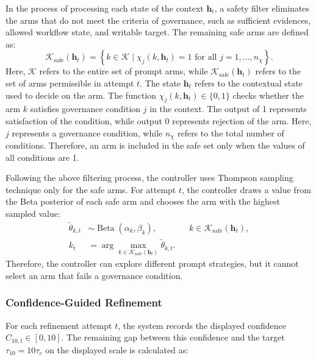 \documentclass[pdflatex,sn-basic]{sn-jnl}
\begin{document}
In the process of processing each state of the context $\mathbf{h}_t$, a safety filter eliminates the arms that do not meet the criteria of governance, such as sufficient evidences, allowed workflow state, and writable target. The remaining safe arms are defined as:
\begin{equation}
\mathcal{K}_{\mathrm{safe}}(\mathbf{h}_t)
=
\left\{k\in\mathcal{K}\mid
\chi_j(k,\mathbf{h}_t)=1
\text{ for all }j=1,\ldots,n_{\chi}\right\}.
\end{equation}
Here, $\mathcal{K}$ refers to the entire set of prompt arms, while $\mathcal{K}_{\mathrm{safe}}(\mathbf{h}_t)$ refers to the set of arms permissible in attempt $t$. The state $\mathbf{h}_t$ refers to the contextual state used to decide on the arm. The function $\chi_j(k,\mathbf{h}_t)\in\{0,1\}$ checks whether the arm $k$ satisfies governance condition $j$ in the context. The output of 1 represents satisfaction of the condition, while output 0 represents rejection of the arm. Here, $j$ represents a governance condition, while $n_{\chi}$ refers to the total number of conditions. Therefore, an arm is included in the safe set only when the values of all conditions are 1.

Following the above filtering process, the controller uses Thompson sampling technique only for the safe arms. For attempt $t$, the controller draws a value from the Beta posterior of each safe arm and chooses the arm with the highest sampled value:
\begin{equation}
\begin{aligned}
\widetilde{\theta}_{k,t}
&\sim \operatorname{Beta}(\alpha_k,\beta_k),
&& k\in\mathcal{K}_{\mathrm{safe}}(\mathbf{h}_t),\\
k_t
&=\arg\max_{k\in\mathcal{K}_{\mathrm{safe}}(\mathbf{h}_t)}
\widetilde{\theta}_{k,t}.
\end{aligned}
\end{equation}
Therefore, the controller can explore different prompt strategies, but it cannot select an arm that fails a governance condition.

\subsubsection{Confidence-Guided Refinement}

For each refinement attempt $t$, the system records the displayed confidence
$C_{10,t}\in[0,10]$. The remaining gap between this confidence and the target
$\tau_{10}=10\tau_c$ on the displayed scale is calculated as:
\end{document}
